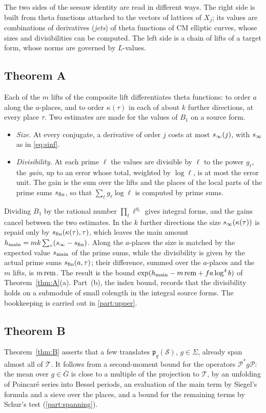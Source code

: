 The two sides of the seesaw identity are read in different ways. The right side is built from theta
functions attached to the vectors of lattices of $X_j$; its values are combinations of derivatives
(\emph{jets}) of theta functions of CM elliptic curves, whose sizes and divisibilities can be computed.
The left side is a chain of lifts of a target form, whose norms are governed by $L$-values.

\subsection{Theorem A}\label{ss:overview-A}
Each of the $m$ lifts of the composite lift differentiates theta functions: to order $a$ along the
$a$-places, and to order $\kappa(\tau)$ in each of about $k$ further directions, at every place $\tau$.
Two estimates are made for the values of $B_1$ on a source form.
\begin{itemize}[leftmargin=1.5em]
\item \emph{Size.} At every conjugate, a derivative of order $j$ costs at most $s_\infty(j)$, with
$s_\infty$ as in \eqref{eq:sinf}.
\item \emph{Divisibility.} At each prime $\ell$ the values are divisible by $\ell$ to the power
$g_\ell$, the \emph{gain}, up to an error whose total, weighted by $\log\ell$, is at most the error unit.
The gain is the sum over the lifts and the places of the local parts of the prime sums $s_{\mathrm{fin}}$, so that
$\sum_\ell g_\ell\log\ell$ is computed by prime sums.
\end{itemize}
Dividing $B_1$ by the rational number $\prod_\ell\ell^{g_\ell}$ gives integral forms, and the gains
cancel between the two estimates. In the $k$ further directions the size $s_\infty(\kappa(\tau))$ is
repaid only by $s_{\mathrm{fin}}(\kappa(\tau),\tau)$, which leaves the main amount
$h_{\mathrm{main}}=mk\sum_\tau(s_\infty-s_{\mathrm{fin}})$. Along the $a$-places the size is matched by the expected value
$s_{\mathrm{main}}$ of the prime sums, while the divisibility is given by the actual prime sums
$s_{\mathrm{fin}}(a,\tau)$; their difference, summed over the $a$-places and the $m$ lifts, is $m\,\mathrm{rem}$. The
result is the bound $\exp(h_{\mathrm{main}}-m\,\mathrm{rem}+fa\log^4b)$ of Theorem~\ref{thm:A}(a). Part~(b), the index
bound, records that the divisibility holds on a submodule of small colength in the integral source
forms. The bookkeeping is carried out in \cref{part:upper}.

\subsection{Theorem B}\label{ss:overview-B}
Theorem~\ref{thm:B} asserts that a few translates $\mathfrak p_g(\mathcal S)$, $g\in \Sigma$, already span
almost all of $\mathcal T$. It follows from a second-moment bound for the operators $\mathcal P^*g\mathcal P$:
the mean over $g\in\bar G$ is close to a multiple of the projection to $\mathcal T$, by an unfolding of
Poincar\'e series into Bessel periods, an evaluation of the main term by Siegel's formula and a sieve
over the places, and a bound for the remaining terms by Schur's test (\cref{part:spanning}).

